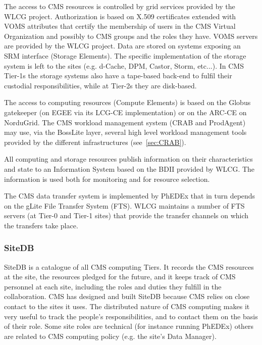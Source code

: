 The access to CMS resources is controlled by grid services provided by the WLCG project.
Authorization is based on X.509 certificates extended with VOMS attributes
that certify the membership of users in the CMS Virtual Organization and possibly 
to CMS groups and the roles they have.
VOMS servers are provided by the WLCG project.
Data are stored on systems exposing an SRM interface (Storage Elements).
The specific implementation of the storage system is left to the sites
(e.g. d-Cache, DPM, Castor, Storm, etc...). In CMS Tier-1s the storage
systems also have a tape-based back-end to fulfil their custodial
responsibilities, while at Tier-2s they are disk-based.

The access to computing resources (Compute Elements) is based on
the Globus gatekeeper (on EGEE via its LCG-CE implementation) or on the ARC-CE on NorduGrid.
The CMS workload management system (CRAB and ProdAgent) may use, via the BossLite layer,
several high level workload management tools provided by the different infrastructures
(see~\ref{sec:CRAB}).


All computing and storage resources publish information on their
characteristics and state to an Information System based
on the BDII provided by WLCG. The information is used both
for monitoring and for resource selection.

The CMS data transfer system is implemented by PhEDEx that
in turn depends on the gLite File Transfer System (FTS).
WLCG maintains a number of FTS servers (at Tier-0 and Tier-1 sites)
that provide the transfer channels on which the transfers take place.


\subsubsection{ SiteDB }
\label{sec:4_1_2}
SiteDB is a catalogue of all CMS computing Tiers.
It records the CMS resources at the site, the resources pledged for the future,
and it keeps track of CMS personnel at each site, including the roles
and duties they fulfill in the collaboration.
CMS has designed and built SiteDB because CMS relies on close contact
to the sites it uses. The distributed nature of CMS computing makes
it very useful to track the people's responsibilities, and to contact
them on the basis of their role. Some site roles are technical
 (for instance running PhEDEx) others are related to CMS computing
 policy (e.g. the site's Data Manager).

